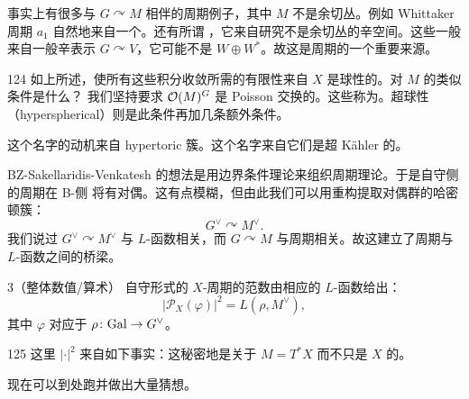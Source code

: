 事实上有很多与 $G\curvearrowright M$ 相伴的周期例子，其中 $M$ 不是余切丛。例如 Whittaker
周期 $a_1$ 自然地来自一个。还有所谓
，它来自研究不是余切丛的辛空间。这些一般来自一般辛表示
$G\curvearrowright V$，它可能不是 $W\oplus W^*$。故这是周期的一个重要来源。

\begin{srcrem}{124}
如上所述，使所有这些积分收敛所需的有限性来自 $X$ 是球性的。对 $M$ 的类似条件是什么？
我们坚持要求 $\mathcal{O}(M)^G$ 是 Poisson 交换的。这些称为。超球性（hyperspherical）则是此条件再加几条额外条件。
\end{srcrem}

这个名字的动机来自 hypertoric 簇。这个名字来自它们是超 Kähler 的。


BZ-Sakellaridis-Venkatesh 的想法是用边界条件理论来组织周期理论。于是自守侧的周期在 B-侧
将有对偶。这有点模糊，但由此我们可以用重构提取对偶群的哈密顿簇：
\begin{equation}\tag{17.141}\label{eq:17.141}
G^{\vee}\curvearrowright M^{\vee}.
\end{equation}
我们说过 $G^{\vee}\curvearrowright M^{\vee}$ 与 $L$-函数相关，而 $G\curvearrowright M$
与周期相关。故这建立了周期与 $L$-函数之间的桥梁。

\begin{srcconj}{3}（整体数值/算术）
自守形式的 $X$-周期的范数由相应的 $L$-函数给出：
\begin{equation}\tag{17.142}\label{eq:17.142}
|\mathcal{P}_X(\varphi)|^2=L(\rho,M^{\vee}),
\end{equation}
其中 $\varphi$ 对应于 $\rho\colon\mathrm{Gal}\to G^{\vee}$。
\end{srcconj}

\begin{srcrem}{125}
这里 $|\cdot|^2$ 来自如下事实：这秘密地是关于 $M=T^*X$ 而不只是 $X$ 的。
\end{srcrem}

现在可以到处跑并做出大量猜想。

